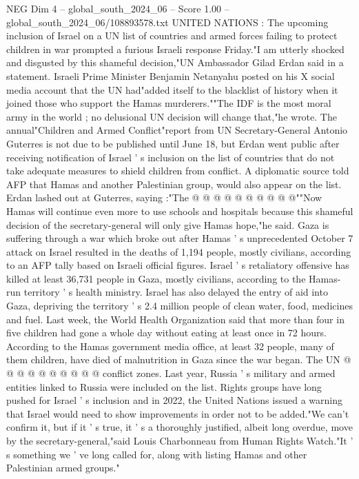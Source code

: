 \begin{textsample}{NEG Dim 4 – global\_south\_2024\_06 – Score 1.00 – global\_south\_2024\_06/108893578.txt}  \label{ex:f4_neg_375}
UNITED NATIONS : The upcoming inclusion of Israel on a UN list of countries and armed forces failing to protect children in war prompted a furious Israeli response Friday."I am utterly shocked and disgusted by this shameful decision,"UN Ambassador Gilad Erdan said in a statement.
Israeli Prime Minister Benjamin Netanyahu posted on his X social media account that the UN had"added itself to the blacklist of history when it joined those who support the Hamas murderers.""The IDF is the most moral army in the world ; no delusional UN decision will change that,"he wrote.
The annual"Children and Armed Conflict"report from UN Secretary-General Antonio Guterres is not due to be published until June 18, but Erdan went public after receiving notification of Israel ' s inclusion on the list of countries that do not take adequate measures to shield children from conflict.
A diplomatic source told AFP that Hamas and another Palestinian group, would also appear on the list.
Erdan lashed out at Guterres, saying :"The @ @ @ @ @ @ @ @ @ @""Now Hamas will continue even more to use schools and hospitals because this shameful decision of the secretary-general will only give Hamas hope,"he said.
Gaza is suffering through a war which broke out after Hamas ' s unprecedented October 7 attack on Israel resulted in the deaths of 1,194 people, mostly civilians, according to an AFP tally based on Israeli official figures.
Israel ' s retaliatory offensive has killed at least 36,731 people in Gaza, mostly civilians, according to the Hamas-run territory ' s health ministry.
Israel has also delayed the entry of aid into Gaza, depriving the territory ' s 2.4 million people of clean water, food, medicines and fuel.
Last week, the World Health Organization said that more than four in five children had gone a whole day without eating at least once in 72 hours.
According to the Hamas government media office, at least 32 people, many of them children, have died of malnutrition in Gaza since the war began.
The UN @ @ @ @ @ @ @ @ @ @ conflict zones.
Last year, Russia ' s military and armed entities linked to Russia were included on the list.
Rights groups have long pushed for Israel ' s inclusion and in 2022, the United Nations issued a warning that Israel would need to show improvements in order not to be added."We can't confirm it, but if it ' s true, it ' s a thoroughly justified, albeit long overdue, move by the secretary-general,"said Louis Charbonneau from Human Rights Watch."It ' s something we ' ve long called for, along with listing Hamas and other Palestinian armed groups."

\end{textsample}
